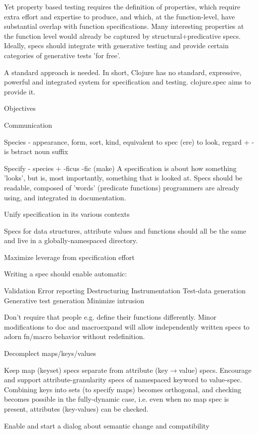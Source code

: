 Yet property based testing requires the definition of properties, which require
extra effort and expertise to produce, and which, at the function-level, have
substantial overlap with function specifications. Many interesting properties at
the function level would already be captured by structural+predicative specs.
Ideally, specs should integrate with generative testing and provide certain
categories of generative tests 'for free'.

A standard approach is needed. In short, Clojure has no standard, expressive,
powerful and integrated system for specification and testing. clojure.spec aims
to provide it.

Objectives

Communication

Species - appearance, form, sort, kind, equivalent to spec (ere) to look, regard
               + -is bstract noun suffix

Specify - species + -ficus -fic (make)
A specification is about how something 'looks', but is, most importantly, something that is looked at. Specs should be readable, composed of 'words' (predicate functions) programmers are already using, and integrated in documentation.

Unify specification in its various contexts

Specs for data structures, attribute values and functions should all be the same and live in a globally-namespaced directory.

Maximize leverage from specification effort

Writing a spec should enable automatic:

Validation
Error reporting
Destructuring
Instrumentation
Test-data generation
Generative test generation
Minimize intrusion

Don’t require that people e.g. define their functions differently. Minor modifications to doc and macroexpand will allow independently written specs to adorn fn/macro behavior without redefinition.

Decomplect maps/keys/values

Keep map (keyset) specs separate from attribute (key$\rightarrow$value) specs. Encourage and support attribute-granularity specs of namespaced keyword to value-spec. Combining keys into sets (to specify maps) becomes orthogonal, and checking becomes possible in the fully-dynamic case, i.e. even when no map spec is present, attributes (key-values) can be checked.

Enable and start a dialog about semantic change and compatibility

